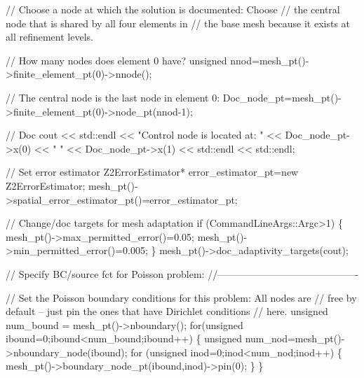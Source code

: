 \begin{DoxyCodeInclude}
 \textcolor{comment}{// Choose a node at which the solution is documented: Choose}
 \textcolor{comment}{// the central node that is shared by all four elements in}
 \textcolor{comment}{// the base mesh because it exists at all refinement levels.}
 
 \textcolor{comment}{// How many nodes does element 0 have?}
 \textcolor{keywordtype}{unsigned} nnod=mesh\_pt()->finite\_element\_pt(0)->nnode();

 \textcolor{comment}{// The central node is the last node in element 0:}
 Doc\_node\_pt=mesh\_pt()->finite\_element\_pt(0)->node\_pt(nnod-1);

 \textcolor{comment}{// Doc}
 cout << std::endl <<  \textcolor{stringliteral}{"Control node is located at: "} 
      << Doc\_node\_pt->x(0) << \textcolor{stringliteral}{" "} << Doc\_node\_pt->x(1) << std::endl << std::endl;


 \textcolor{comment}{// Set error estimator}
 Z2ErrorEstimator* error\_estimator\_pt=\textcolor{keyword}{new} Z2ErrorEstimator;
 mesh\_pt()->spatial\_error\_estimator\_pt()=error\_estimator\_pt;
 
 \textcolor{comment}{// Change/doc targets for mesh adaptation}
 \textcolor{keywordflow}{if} (CommandLineArgs::Argc>1) 
  \{
   mesh\_pt()->max\_permitted\_error()=0.05;
   mesh\_pt()->min\_permitted\_error()=0.005;
  \}
 mesh\_pt()->doc\_adaptivity\_targets(cout);


 \textcolor{comment}{// Specify BC/source fct for Poisson problem:}
 \textcolor{comment}{//-------------------------------------------}

 \textcolor{comment}{// Set the Poisson boundary conditions for this problem: All nodes are}
 \textcolor{comment}{// free by default -- just pin the ones that have Dirichlet conditions}
 \textcolor{comment}{// here. }
 \textcolor{keywordtype}{unsigned} num\_bound = mesh\_pt()->nboundary();
 \textcolor{keywordflow}{for}(\textcolor{keywordtype}{unsigned} ibound=0;ibound<num\_bound;ibound++)
  \{
   \textcolor{keywordtype}{unsigned} num\_nod=mesh\_pt()->nboundary\_node(ibound);
   \textcolor{keywordflow}{for} (\textcolor{keywordtype}{unsigned} inod=0;inod<num\_nod;inod++)
    \{
     mesh\_pt()->boundary\_node\_pt(ibound,inod)->pin(0); 
    \}
  \}


\end{DoxyCodeInclude}
